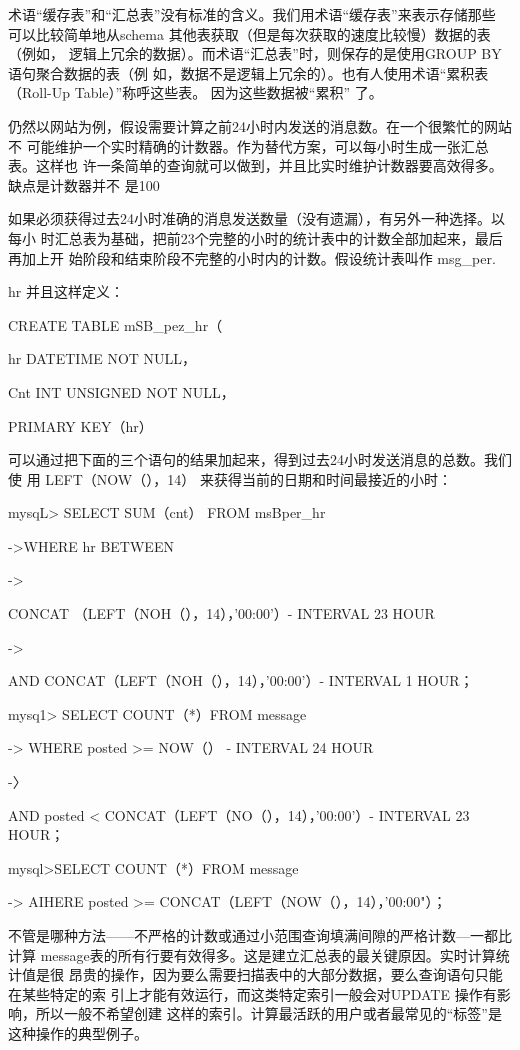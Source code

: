 术语“缓存表”和“汇总表”没有标准的含义。我们用术语“缓存表”来表示存储那些
可以比较简单地从schema 其他表获取（但是每次获取的速度比较慢）数据的表（例如，
逻辑上冗余的数据）。而术语“汇总表”时，则保存的是使用GROUP BY语句聚合数据的表（例
如，数据不是逻辑上冗余的）。也有人使用术语“累积表（Roll-Up Table）”称呼这些表。
因为这些数据被“累积” 了。

仍然以网站为例，假设需要计算之前24小时内发送的消息数。在一个很繁忙的网站不
可能维护一个实时精确的计数器。作为替代方案，可以每小时生成一张汇总表。这样也
许一条简单的查询就可以做到，并且比实时维护计数器要高效得多。缺点是计数器并不
是100%

如果必须获得过去24小时准确的消息发送数量（没有遗漏），有另外一种选择。以每小
时汇总表为基础，把前23个完整的小时的统计表中的计数全部加起来，最后再加上开
始阶段和结束阶段不完整的小时内的计数。假设统计表叫作 msg\_per.

hr 并且这样定义：

CREATE TABLE mSB\_pez\_hr（

hr DATETIME NOT NULL，

Cnt INT UNSIGNED NOT NULL，

PRIMARY KEY（hr）

可以通过把下面的三个语句的结果加起来，得到过去24小时发送消息的总数。我们使
用 LEFT（NOW（），14） 来获得当前的日期和时间最接近的小时：

mysqL> SELECT SUM（cnt） FROM msBper\_hr

->WHERE hr BETWEEN

->

CONCAT （LEFT（NOH（），14），'00:00'）- INTERVAL 23 HOUR

->

AND CONCAT（LEFT（NOH（），14），'00:00'）- INTERVAL 1 HOUR；

mysq1> SELECT COUNT（*）FROM message

-> WHERE posted >= NOW（） - INTERVAL 24 HOUR

-〉

AND posted < CONCAT（LEFT（NO（），14），'00:00'）- INTERVAL 23 HOUR；

mysql>SELECT COUNT（*）FROM message

-> AIHERE posted >= CONCAT（LEFT（NOW（），14），'00:00"）；

不管是哪种方法——不严格的计数或通过小范围查询填满间隙的严格计数—一都比计算
message表的所有行要有效得多。这是建立汇总表的最关键原因。实时计算统计值是很
昂贵的操作，因为要么需要扫描表中的大部分数据，要么查询语句只能在某些特定的索
引上才能有效运行，而这类特定索引一般会对UPDATE 操作有影响，所以一般不希望创建
这样的索引。计算最活跃的用户或者最常见的“标签”是这种操作的典型例子。

